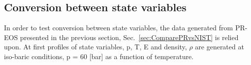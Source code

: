 \documentclass[11pt]{article}
\begin{document}
\subsection{Conversion between state variables}
In order to test conversion between state variables, the data generated from PR-EOS presented in the previous section, Sec.~\ref{sec:ComparePRvsNIST} is relied upon. At first profiles of state variables, p, T, E and density, $\rho$
are generated at iso-baric conditions, p = 60 [bar] as a function of temperature.  
\end{document}
